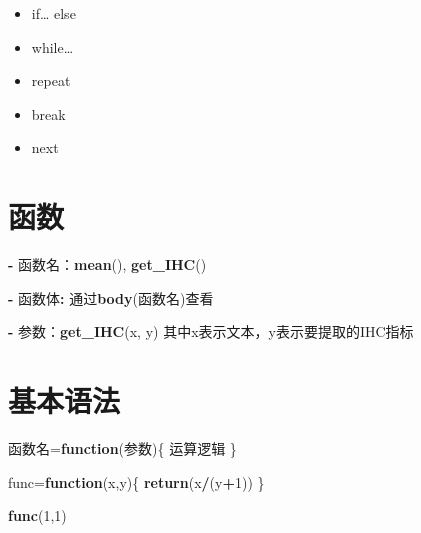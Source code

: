 \documentclass[]{book}
\newenvironment{Shaded}{\begin{snugshade}}{\end{snugshade}}
\newcommand{\ControlFlowTok}[1]{\textcolor[rgb]{0.13,0.29,0.53}{\textbf{#1}}}
\newcommand{\DecValTok}[1]{\textcolor[rgb]{0.00,0.00,0.81}{#1}}
\newcommand{\KeywordTok}[1]{\textcolor[rgb]{0.13,0.29,0.53}{\textbf{#1}}}
\newcommand{\NormalTok}[1]{#1}
\newcommand{\OperatorTok}[1]{\textcolor[rgb]{0.81,0.36,0.00}{\textbf{#1}}}
\newcommand{\StringTok}[1]{\textcolor[rgb]{0.31,0.60,0.02}{#1}}
\providecommand{\tightlist}{%
  \setlength{\itemsep}{0pt}\setlength{\parskip}{0pt}}
\begin{document}
\begin{itemize}
\tightlist
\item
  if\ldots{} else
\item
  while\ldots{}
\item
  repeat
\item
  break
\item
  next
\end{itemize}

\hypertarget{section-6}{%
\section{函数}\label{section-6}}

\begin{Shaded}
\begin{Highlighting}[]
\OperatorTok{-}\StringTok{ }\NormalTok{函数名：}\KeywordTok{mean}\NormalTok{(), }\KeywordTok{get_IHC}\NormalTok{()}
\end{Highlighting}
\end{Shaded}

\begin{Shaded}
\begin{Highlighting}[]
\OperatorTok{-}\StringTok{ }\NormalTok{函数体}\OperatorTok{:}\StringTok{ }\NormalTok{通过}\KeywordTok{body}\NormalTok{(函数名)查看}
\end{Highlighting}
\end{Shaded}

\begin{Shaded}
\begin{Highlighting}[]
\OperatorTok{-}\StringTok{ }\NormalTok{参数：}\KeywordTok{get_IHC}\NormalTok{(x, y) 其中x表示文本，y表示要提取的IHC指标}
\end{Highlighting}
\end{Shaded}

\hypertarget{section-7}{%
\section{基本语法}\label{section-7}}

\begin{Shaded}
\begin{Highlighting}[]
\NormalTok{函数名=}\ControlFlowTok{function}\NormalTok{(参数)\{}
\NormalTok{  运算逻辑}
\NormalTok{\}}
\end{Highlighting}
\end{Shaded}

\begin{Shaded}
\begin{Highlighting}[]
\NormalTok{func=}\ControlFlowTok{function}\NormalTok{(x,y)\{}
  \KeywordTok{return}\NormalTok{(x}\OperatorTok{/}\NormalTok{(y}\OperatorTok{+}\DecValTok{1}\NormalTok{))}
\NormalTok{\}}

\KeywordTok{func}\NormalTok{(}\DecValTok{1}\NormalTok{,}\DecValTok{1}\NormalTok{)}
\end{Highlighting}
\end{Shaded}
\end{document}
